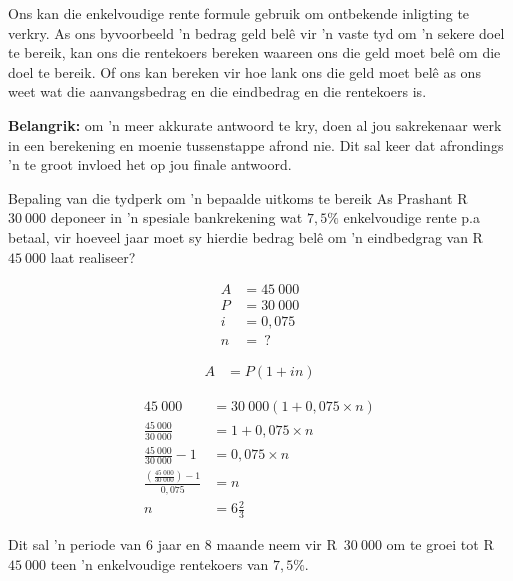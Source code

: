 Ons kan die enkelvoudige rente formule gebruik om ontbekende inligting te verkry. As ons byvoorbeeld 'n bedrag geld bel\^{e} vir 'n vaste tyd om 'n sekere doel te bereik, kan ons die rentekoers bereken waareen ons die geld moet bel\^{e} om die doel te bereik. Of ons kan bereken vir hoe lank ons die geld moet bel\^{e} as ons weet wat die aanvangsbedrag en die eindbedrag en die rentekoers is. 

\par
\textbf{Belangrik:} om 'n meer akkurate antwoord te kry, doen al jou sakrekenaar werk in een berekening en moenie tussenstappe afrond nie. Dit sal keer dat afrondings 'n te groot invloed het op jou finale antwoord.


\begin{wex}{Bepaling van die tydperk om 'n bepaalde uitkoms te bereik}
{As Prashant  R~$30~000$ deponeer in ’n spesiale
bankrekening wat $7,5\%$ enkelvoudige rente p.a betaal, vir hoeveel jaar moet
sy hierdie bedrag belê om 'n eindbedgrag van R~$45~000$ laat realiseer?}
{
    \begin{align*}
	A &= 45~000\\
	P &= 30~000\\
	i &= 0,075\\
	n &= ~?
    \end{align*}

    \begin{align*}
	A &= P(1 + in)
    \end{align*}

    \begin{align*}
	45~000 &= 30~000(1 + 0,075 \times n)\\
	\frac{45~000}{30~000} &= 1 + 0,075 \times n\\
	\frac{45~000}{30~000} -1 &= 0,075 \times n\\
	\frac{(\frac{45~000}{30~000}) -1}{0,075} &= n\\
	n &= 6\frac{2}{3}
    \end{align*}

    Dit sal ’n periode van 6 jaar en 8 maande neem vir R~$30~000$ om te groei tot R~$45~000$ teen ’n enkelvoudige rentekoers van $7,5\%$.
    }
\end{wex}




